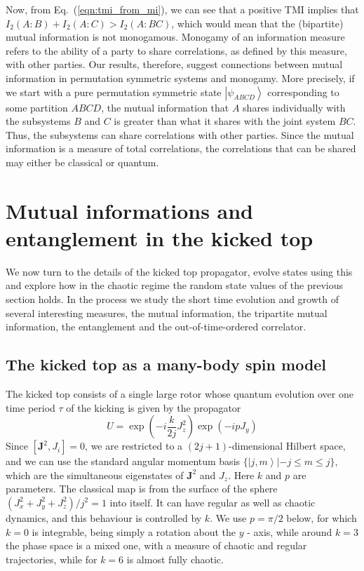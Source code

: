 \documentclass[pre,aps,showpacs,showkeys,twocolumn]{revtex4-1}
\newcommand\ket[1]{\left|#1\right\rangle}
\theoremstyle{definition}
\theoremstyle{remark}
\begin{document}
Now, from Eq.~(\ref{eqn:tmi_from_mi}), we can see that a positive TMI implies that $I_2(A: B) + I_2(A: C) > I_2(A: BC)$, which would mean that the (bipartite) mutual information is not monogamous. Monogamy of an information measure refers to the ability of a party to share correlations, as defined by this measure, with other parties. Our results, therefore, suggest connections between mutual information in permutation symmetric systems and monogamy. More precisely, if we start with a pure permutation symmetric state $\ket{\psi_{ABCD}}$ corresponding to some partition $ABCD$, the mutual information that $A$ shares individually with the subsystems $B$ and $C$ is greater than what it shares with the joint system $BC$. Thus, the subsystems can share correlations with other parties. Since the mutual information is a measure of total correlations, the correlations that can be shared may either be classical or quantum.
 
\section{Mutual informations and entanglement in the kicked top}

We now turn to the details of the kicked top propagator, evolve states using this and explore how in the chaotic regime the 
random state values of the previous section holds. In the process we study the short time evolution and growth of 
several interesting measures, the mutual information, the tripartite mutual information, the entanglement and the 
out-of-time-ordered correlator.

\subsection{The kicked top as a many-body spin model}
The kicked top consists of a single large rotor whose quantum evolution over one time period $\tau$ of the kicking is given by the propagator \cite{Haake}
\begin{equation}
    U = \exp\left(-i \frac{k}{2j} J_z^2\right) \exp\left(-i p J_y\right) \label{report1eqn:kicedtopunitary}
\end{equation}
Since $[\bm{J}^2, J_i] = 0$, we are restricted to a $(2j + 1)$-dimensional Hilbert space, and we can use the standard angular momentum basis $\{\ket{j, m} | -j \leq m \leq j\}$, which are the simultaneous eigenstates of $\bm{J}^2$ and $J_z$. Here $k$ and $p$ are parameters. The classical map \cite{Haake, kus1987symmetry, kus88, Zyczkowski90} is from the surface of the sphere $(J_x^2 + J_y^2 + J_z^2)/j^2 = 1$ into itself. It can have regular as well as chaotic dynamics, and this behaviour is controlled by $k$. We use $p = \pi/2$ below, for which $k = 0$ is integrable, being simply a rotation about the $y$ - axis, while around $k = 3$ the phase space is a mixed one, with a measure of chaotic and regular trajectories, while for $k = 6$ is almost fully chaotic.
\end{document}
